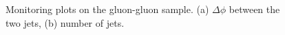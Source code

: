 \begin{figure}[htb]
	\centering


  \caption{Monitoring plots on the gluon-gluon sample. 
	(a) $\Delta\phi$ between the two jets,
	(b) number of jets.
}
 \label{fig:GGmonitoring4}
\end{figure}


\clearpage

